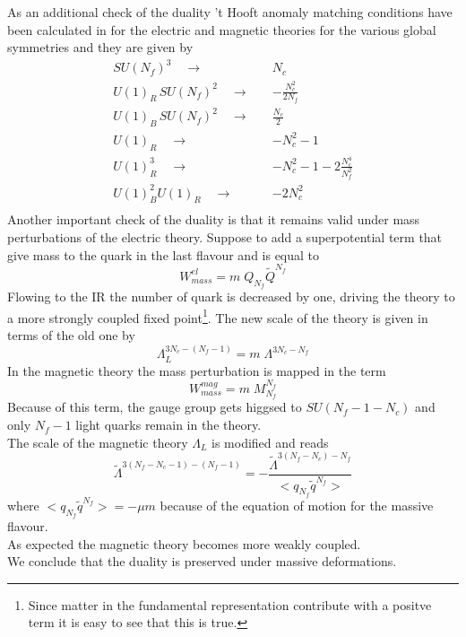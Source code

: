 As an additional check of the duality 't Hooft anomaly matching conditions have been calculated  in \cite{Seiberg:1994pq} for the electric and magnetic theories for the various global symmetries and they are given by
\begin{equation}
\begin{aligned}
SU(N_f)^3 \quad \longrightarrow \quad   & N_c \\
U(1)_R\, SU(N_f)^2 \quad \longrightarrow \quad  & -\frac{N_c^2}{2 N_f} \\
U(1)_B\, SU(N_f)^2 \quad \longrightarrow \quad  & \frac{N_c}{2} \\
U(1)_R \quad \longrightarrow \quad  & -N_c^2 - 1 \\
U(1)_R^3 \quad \longrightarrow \quad  & -N_c^2 - 1 - 2 \frac{N_c^4}{N_f^2} \\
U(1)_B^2 U(1)_R \quad \longrightarrow \quad  & - 2 N_c^2 \\
\end{aligned}
\end{equation}
Another important check of the duality is that it remains valid under mass perturbations of the electric theory.
Suppose to add a superpotential term that give mass to the quark in the last flavour and is equal to
\begin{equation}
	W_{mass}^{el} = m \; Q_{N_f} \tilde{Q}^{N_f}
\end{equation}
Flowing to the IR the number of quark is decreased by one, driving the theory to a more strongly coupled fixed point\footnote{Since matter in the fundamental representation contribute with a positve term it is easy to see that this is true.}.
The new scale of the theory is given in terms of the old one by
\begin{equation}
 \Lambda_{L}^{3 N_c - (N_f - 1)} = m \; \Lambda^{3 N_c - N_f}
\end{equation}
In the magnetic theory the mass perturbation is mapped in the  term
\begin{equation}
W_{mass}^{mag} = m \; M_{N_f}^{N_f}
\end{equation}
Because of this term, the gauge group gets higgsed to $SU(N_f-1 - N_c)$ and only $N_f -1$ light quarks remain in the theory. \\
The scale of the magnetic theory $\Lambda_L$ is modified and reads
\begin{equation}
\tilde{\Lambda}^{3(N_f - N_c -1) - (N_f -1)} = 
- \frac{
	\tilde{\Lambda}^{3 (N_f - N_c) - N_f}	
	}
	{
	< q_{N_f} \tilde{q}^{N_f}		>
	}
\end{equation}
where $< q_{N_f} \tilde{q}^{N_f}> = - \mu m $ because of the equation of motion for the massive flavour. \\
As expected the magnetic theory becomes more weakly coupled.\\
We conclude that the duality is preserved under massive deformations.  